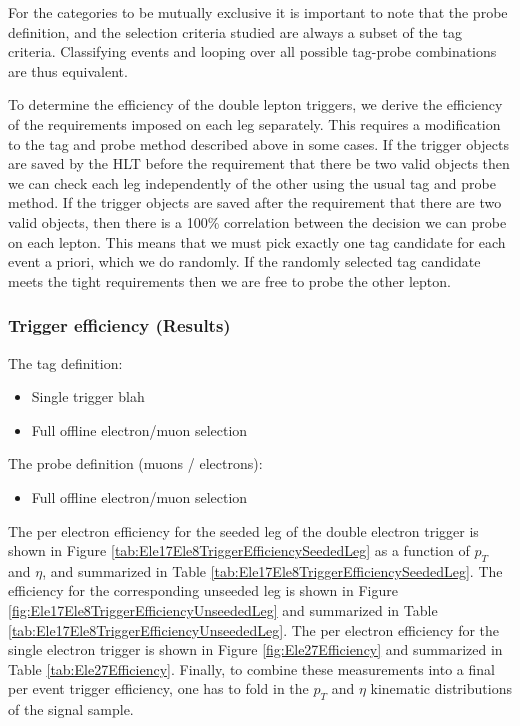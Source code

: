 For the categories to be mutually exclusive it is important to note that the probe definition, 
and the selection criteria studied are always a subset of the tag criteria.
Classifying events and looping over all possible tag-probe combinations are thus equivalent.

To determine the efficiency of the double lepton triggers, we derive the efficiency of the requirements imposed on each leg separately.
This requires a modification to the tag and probe method described above in some cases.
If the trigger objects are saved by the HLT before the requirement that there be two valid objects then
we can check each leg independently of the other using the usual tag and probe method.
If the trigger objects are saved after the requirement that there are two valid objects, then there is 
a 100\% correlation between the decision we can probe on each lepton.
This means that we must pick exactly one tag candidate for each event a priori, which we do 
randomly. 
If the randomly selected tag candidate meets the tight requirements then we are free to 
probe the other lepton.

\subsubsection{Trigger efficiency (Results)}

The tag definition:
\begin{itemize}
	\item  Single trigger blah
	\item Full offline electron/muon selection
\end{itemize}
	
The probe definition (muons / electrons):
\begin{itemize}
	\item  Full offline electron/muon selection
\end{itemize}

  
The per electron efficiency for the seeded leg of the double electron trigger is shown in 
Figure \ref{tab:Ele17Ele8TriggerEfficiencySeededLeg} as a function of $p_{T}$ and $\eta$, 
and summarized in Table \ref{tab:Ele17Ele8TriggerEfficiencySeededLeg}. The efficiency for 
the corresponding unseeded leg is shown in Figure 
\ref{fig:Ele17Ele8TriggerEfficiencyUnseededLeg} and summarized in Table 
\ref{tab:Ele17Ele8TriggerEfficiencyUnseededLeg}. The per electron efficiency for the
single electron trigger is shown in Figure \ref{fig:Ele27Efficiency} and summarized
in Table \ref{tab:Ele27Efficiency}. Finally, to combine these measurements into a final per event
trigger efficiency, one has to fold in the $p_{T}$ and $\eta$ kinematic distributions
of the signal sample.


